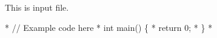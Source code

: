 This is input file.


\begin{DoxyCode}
* \textcolor{comment}{// Example code here}
* \textcolor{keywordtype}{int} main() \{
*     \textcolor{keywordflow}{return} 0;
* \}
* 
\end{DoxyCode}
 